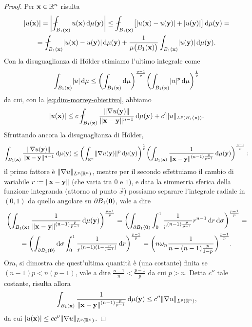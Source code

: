 \begin{proof}
    Per $\vec x\in\R^n$ risulta
    \begin{multline}
        \abs{u(\vec x)}=
        \abs[\bigg]{\avint_{B_1(\vec x)} u(\vec x)\,\dd\mu(\vec y)}\le
        \avint_{B_1(\vec x)}\bigl[\abs{u(\vec x)-u(\vec y)}+\abs{u(\vec y)}\bigr]\,\dd\mu(\vec y)=\\=
        \avint_{B_1(\vec x)}\abs{u(\vec x)-u(\vec y)}\,\dd\mu(\vec y)+\frac1{\mu\bigl(B_1(\vec x)\bigr)}\int_{B_1(\vec x)}\abs{u(\vec y)}\,\dd\mu(\vec y).
    \end{multline}
    Con la disuguaglianza di Hölder stimiamo l'ultimo integrale come 
    \begin{equation}
        \int_{B_1(\vec x)}\abs{u}\,\dd\mu\le
        \biggl(\int_{B_1(\vec x)}\dd\mu\biggr)^\frac{p-1}{p}\biggl(\int_{B_1(\vec x)}\abs{u}^p\,\dd\mu\biggr)^\frac1{p}
    \end{equation}
    da cui, con la \eqref{eq:dim-morrey-obiettivo}, abbiamo
    \begin{equation}
        \abs{u(\vec x)}\le c\avint_{B_1(\vec x)} \frac{\norm{\grad u(\vec y)}}{\norm{\vec x-\vec y}^{n-1}}\,\dd\mu(\vec y)+c'\norm{u}_{\leb[p]{B_1(\vec x)}}.
    \end{equation}
    Sfruttando ancora la disuguaglianza di Hölder,
    \begin{equation}
        \int_{B_1(\vec x)} \frac{\norm{\grad u(\vec y)}}{\norm{\vec x-\vec y}^{n-1}}\,\dd\mu(\vec y)\le
        \biggl(\int_{\R^n}\norm{\grad u(\vec y)}^p\,\dd\mu(\vec y)\biggr)^\frac1{p}\biggl(\int_{B_1(\vec x)}\frac1{\norm{\vec x-\vec y}^{(n-1)\frac{p}{p-1}}}\,\dd\mu(\vec y)\biggr)^\frac{p-1}{p}:
    \end{equation}
    il primo fattore è $\norm{\grad u}_{\leb[p]{\R^n}}$, mentre per il secondo effettuiamo il cambio di variabile $r\defeq\norm{\vec x-\vec y}$ (che varia tra $0$ e $1$), e data la simmetria sferica della funzione integranda (attorno al punto $\vec x$) possiamo separare l'integrale radiale in $(0,1)$ da quello angolare su $\boundary B_1(\vec 0)$, vale a dire
    \begin{multline}
        \biggl(\int_{B_1(\vec x)}\frac1{\norm{\vec x-\vec y}^{(n-1)\frac{p}{p-1}}}\,\dd\mu(\vec y)\biggr)^\frac{p-1}{p}=
        \biggl(\int_{\boundary B_1(\vec 0)}\int_0^1 \frac1{r^{(n-1)\frac{p}{p-1}}}r^{n-1}\,\dd r\,\dd\sigma\biggr)^\frac{p-1}{p}=\\=
        \biggl(\int_{\boundary B_1(\vec 0)}\dd\sigma\int_0^1 \frac1{r^{(n-1)(1-\frac{p}{p-1})}}\,\dd r\biggr)^\frac{p-1}{p}=
        \biggl(n\omega_n\frac1{n-(n-1)\frac{p}{1-p}}\biggr)^\frac{p-1}{p}.
    \end{multline}
    Ora, si dimostra che quest'ultima quantità è (una costante) finita se $(n-1)p<n(p-1)$, vale a dire $\frac{n-1}{n}<\frac{p-1}{p}$ da cui $p>n$.
    Detta $c''$ tale costante, risulta allora
    \begin{equation}
        \int_{B_1(\vec x)}\frac1{\norm{\vec x-\vec y}^{(n-1)\frac{p}{p-1}}}\,\dd\mu(\vec y)\le
        c''\norm{\grad u}_{\leb[p]{\R^n}},
    \end{equation}
    da cui $\abs{u(\vec x)}\le cc''\norm{\grad u}_{\leb[p]{\R^n}}$.


\end{proof}
